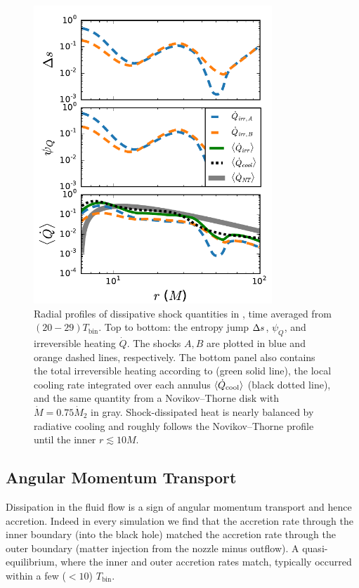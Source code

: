 \begin{figure}
\begin{center}
\includegraphics[width=0.8\textwidth]{figures/minidisk/q011_m3_diss_r.pdf}
\end{center}
\caption{ Radial profiles of dissipative shock quantities in , time averaged from $(20 - 29) T_\text{bin}$.  Top to bottom: the entropy jump $\Delta s$, $\psi_Q$, and irreversible heating $\dot{Q}$. The shocks $A,B$ are plotted in blue and orange dashed lines, respectively.  The bottom panel also contains the total irreversible heating according to  (green solid line), the local cooling rate integrated over each annulus $\langle \dot{Q}_\text{cool} \rangle$  (black dotted line), and the same quantity from a Novikov--Thorne disk with $\dot{M} = 0.75 \dot{M}_2$ in gray.  Shock-dissipated heat is nearly balanced by radiative cooling and roughly follows the Novikov--Thorne profile until the inner $r\lesssim 10M$.}
\end{figure}

\subsection{Angular Momentum Transport}

Dissipation in the fluid flow is a sign of angular momentum transport and hence accretion. Indeed in every simulation we find that the accretion rate through the inner boundary (into the black hole) matched the accretion rate through the outer boundary (matter injection from the nozzle minus outflow).  A quasi-equilibrium, where the inner and outer accretion rates match, typically occurred within a few ($<10$) $T_\text{bin}$. 

